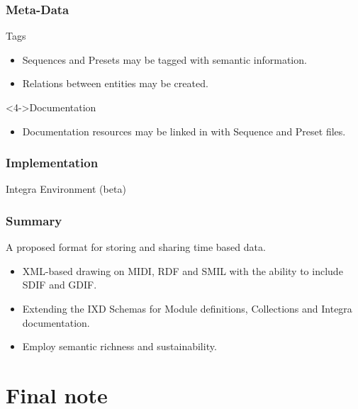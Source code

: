 \documentclass[xcolor=table]{beamer}
\begin{document}
\begin{frame}
  \frametitle{Meta-Data}
  \begin{block}{Tags}
    \begin{itemize}
    \item<2-> Sequences and Presets may be tagged with semantic information.
    \item<3-> Relations between entities may be created.
    \end{itemize}
  \end{block}
  \begin{block}<4->{Documentation}
    \begin{itemize}
    \item<5-> Documentation resources may be linked in with Sequence and Preset files.
    \end{itemize}
  \end{block}
\end{frame}

\begin{frame}
  \frametitle{Implementation}
  \begin{block}{Integra Environment (beta)}
  \end{block}
\end{frame}

\begin{frame}
  \frametitle{Summary}
  \begin{block}{A proposed format for storing and sharing time based data.}
    \begin{itemize}
    \item<1-> XML-based drawing on MIDI, RDF and SMIL with the ability to include SDIF and GDIF.
    \item<2-> Extending the IXD Schemas for Module definitions, Collections and Integra documentation.
    \item<3-> Employ semantic richness and sustainability.
    \end{itemize}
  \end{block}
\end{frame}

\section{Final note}
\end{document}
